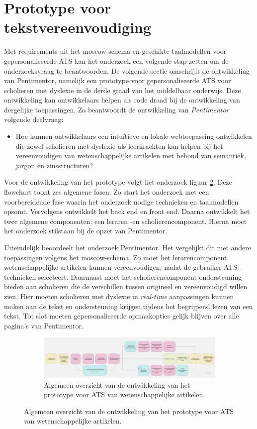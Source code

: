 \section{Prototype voor tekstvereenvoudiging}

Met requirements uit het moscow-schema en geschikte taalmodellen voor gepersonaliseerde ATS kan het onderzoek een volgende stap zetten om de onderzoeksvraag te beantwoorden. De volgende sectie omschrijft de ontwikkeling van Pentimentor, namelijk een prototype voor gepersonaliseerde ATS voor scholieren met dyslexie in de derde graad van het middelbaar onderwijs. Deze ontwikkeling kan ontwikkelaars helpen als rode draad bij de ontwikkeling van dergelijke toepassingen. Zo beantwoordt de ontwikkeling van \textit{Pentimentor} volgende deelvraag: 

\begin{itemize}
	\item Hoe kunnen ontwikkelaars een intuïtieve en lokale webtoepassing ontwikkelen die zowel scholieren met dyslexie als leerkrachten kan helpen bij het vereenvoudigen van wetenschappelijke artikelen met behoud van semantiek, jargon en zinsstructuren?
\end{itemize}

Voor de ontwikkeling van het prototype volgt het onderzoek figuur \ref{img:general-overview-prototype}. Deze flowchart toont zes algemene fasen. Zo start het onderzoek met een voorbereidende fase waarin het onderzoek nodige technieken en taalmodellen opsomt. Vervolgens ontwikkelt het back end en front end. Daarna ontwikkelt het twee algemene componenten: een leraren -en scholierencomponent. Hierna moet het onderzoek stilstaan bij de opzet van Pentimentor. 

\medspace

Uiteindelijk beoordeelt het onderzoek Pentimentor. Het vergelijkt dit met andere toepassingen volgens het moscow-schema. Zo moet het lerarencomponent wetenschappelijke artikelen kunnen vereenvoudigen, nadat de gebruiker ATS-technieken selecteert. Daarnaast moet het scholierencomponent ondersteuning bieden aan scholieren die de verschillen tussen origineel en vereenvoudigd willen zien. Hier moeten scholieren met dyslexie in \textit{real-time} aanpassingen kunnen maken aan de tekst en ondersteuning krijgen tijdens het begrijpend lezen van een tekst. Tot slot moeten gepersonaliseerde opmaakopties gelijk blijven over alle pagina's van Pentimentor.


\begin{figure}
	\begin{figure}[H]
		\includegraphics[width=\linewidth]{img/flowchart-general-development.jpg}
		\caption{Algemeen overzicht van de ontwikkeling van het prototype voor ATS van wetenschappelijke artikelen.}
		\label{img:general-overview-prototype}
	\end{figure}
\end{figure}

